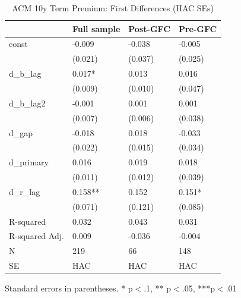 \begin{table}
\caption{ACM 10y Term Premium: First Differences (HAC SEs)}
\label{tab:r_estimation_results}
\begin{center}
\begin{tabular}{llll}
\hline
               & Full sample & Post-GFC & Pre-GFC  \\
\hline
const          & -0.009      & -0.038   & -0.005   \\
               & (0.021)     & (0.037)  & (0.025)  \\
d\_b\_lag      & 0.017*      & 0.013    & 0.016    \\
               & (0.009)     & (0.010)  & (0.047)  \\
d\_b\_lag2     & -0.001      & 0.001    & 0.001    \\
               & (0.007)     & (0.006)  & (0.038)  \\
d\_gap         & -0.018      & 0.018    & -0.033   \\
               & (0.022)     & (0.015)  & (0.034)  \\
d\_primary     & 0.016       & 0.019    & 0.018    \\
               & (0.011)     & (0.012)  & (0.039)  \\
d\_r\_lag      & 0.158**     & 0.152    & 0.151*   \\
               & (0.071)     & (0.121)  & (0.085)  \\
R-squared      & 0.032       & 0.043    & 0.031    \\
R-squared Adj. & 0.009       & -0.036   & -0.004   \\
N              & 219         & 66       & 148      \\
SE             & HAC         & HAC      & HAC      \\
\hline
\end{tabular}
\end{center}
\end{table}
\bigskip
Standard errors in parentheses. \newline 
* p$<$.1, ** p$<$.05, ***p$<$.01